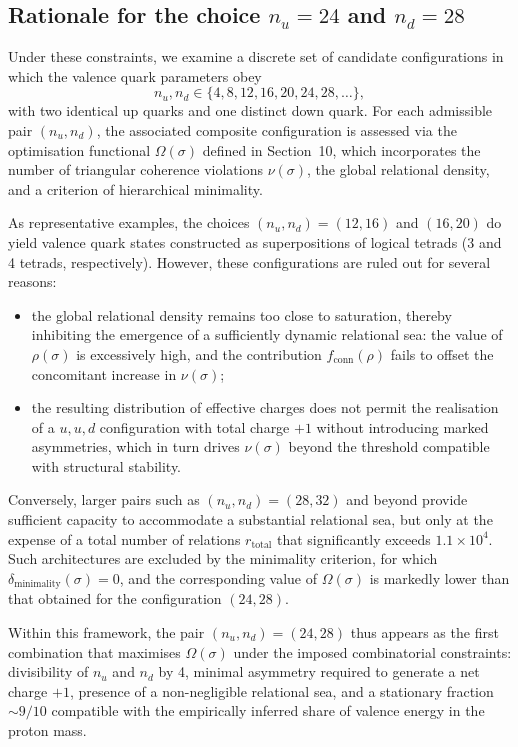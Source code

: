\documentclass[11pt,a4paper]{article}
\begin{document}
\subsection{Rationale for the choice \(n_u = 24\) and \(n_d = 28\)}
Under these constraints, we examine a discrete set of candidate configurations in which the valence quark parameters obey
\[
n_u, n_d \in \{4, 8, 12, 16, 20, 24, 28, \ldots\},
\]
with two identical up quarks and one distinct down quark. For each admissible pair \((n_u, n_d)\), the associated composite configuration is assessed via the optimisation functional \(\Omega(\sigma)\) defined in Section~10, which incorporates the number of triangular coherence violations \(\nu(\sigma)\), the global relational density, and a criterion of hierarchical minimality.

As representative examples, the choices \((n_u, n_d) = (12,16)\) and \((16,20)\) do yield valence quark states constructed as superpositions of logical tetrads (3 and 4 tetrads, respectively). However, these configurations are ruled out for several reasons:
\begin{itemize}[label=-]
  \item the global relational density remains too close to saturation, thereby inhibiting the emergence of a sufficiently dynamic relational sea: the value of \(\rho(\sigma)\) is excessively high, and the contribution \(f_{\mathrm{conn}}(\rho)\) fails to offset the concomitant increase in \(\nu(\sigma)\);
  \item the resulting distribution of effective charges does not permit the realisation of a \(u,u,d\) configuration with total charge \(+1\) without introducing marked asymmetries, which in turn drives \(\nu(\sigma)\) beyond the threshold compatible with structural stability.
\end{itemize}

Conversely, larger pairs such as \((n_u, n_d) = (28,32)\) and beyond provide sufficient capacity to accommodate a substantial relational sea, but only at the expense of a total number of relations \(r_{\mathrm{total}}\) that significantly exceeds \(1.1 \times 10^{4}\). Such architectures are excluded by the minimality criterion, for which \(\delta_{\text{minimality}}(\sigma) = 0\), and the corresponding value of \(\Omega(\sigma)\) is markedly lower than that obtained for the configuration \((24,28)\).

Within this framework, the pair \((n_u, n_d) = (24,28)\) thus appears as the first combination that maximises \(\Omega(\sigma)\) under the imposed combinatorial constraints: divisibility of \(n_u\) and \(n_d\) by 4, minimal asymmetry required to generate a net charge \(+1\), presence of a non-negligible relational sea, and a stationary fraction \(\sim 9/10\) compatible with the empirically inferred share of valence energy in the proton mass.
\end{document}

